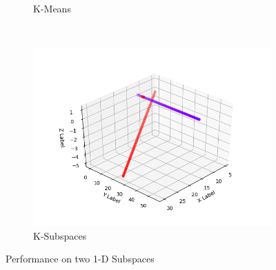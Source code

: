 \documentclass[12pt]{article}
\begin{document}
\begin{enumerate}
\begin{figure}
\begin{subfigure}[b]{0.3\textwidth}
        \caption{K-Means}
        \label{fig:kmeans}
    \end{subfigure}
    ~ %
    \begin{subfigure}[b]{0.3\textwidth}
        \includegraphics[width=\textwidth]{ksubfigures/2linesksub.png}
        \caption{K-Subspaces}
        \label{fig:ksub}
    \end{subfigure}
    \caption{Performance on two 1-D Subspaces}\label{fig:2lineswhole}
\end{figure}



\end{enumerate}
\end{document}
